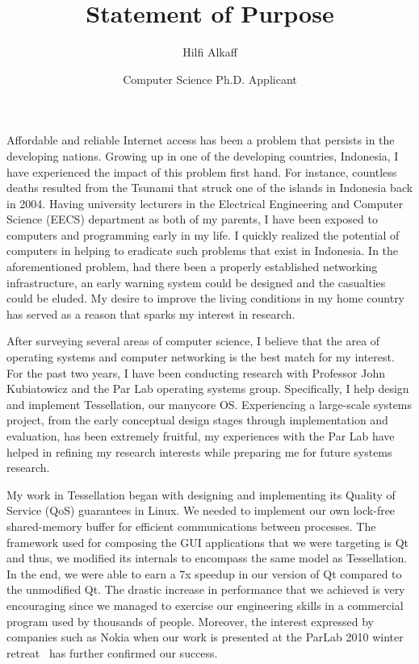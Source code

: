 \documentclass[11pt]{article}
\title{Statement of Purpose}
\author{Hilfi Alkaff}
\date{Computer Science Ph.D. Applicant}
\begin{document}
  \maketitle%

Affordable and reliable Internet access has been a problem that persists in the developing nations. Growing up in one of the developing countries, Indonesia, I have experienced the impact of this problem first hand. For instance, countless deaths resulted from the Tsunami that struck one of the islands in Indonesia back in 2004. Having university lecturers in the Electrical Engineering and Computer Science (EECS) department as both of my parents, I have been exposed to computers and programming early in my life. I quickly realized the potential of computers in helping to eradicate such problems that exist in Indonesia. In the aforementioned problem, had there been a properly established networking infrastructure, an early warning system could be designed and the casualties could be eluded. My desire to improve the living conditions in my home country has served as a reason that sparks my interest in research. \newline

After surveying several areas of computer science, I believe that the area of operating systems and computer networking is the best match for my interest. For the past two years, I have been conducting research with Professor John Kubiatowicz and the Par Lab operating systems group. Specifically, I help design and implement Tessellation, our manycore OS. Experiencing a large-scale systems project, from the early conceptual design stages through implementation and evaluation, has been extremely fruitful, my experiences with the Par Lab have helped in refining my research interests while preparing me for future systems research. \newline

My work in Tessellation began with designing and implementing its Quality of Service (QoS) guarantees in Linux. We needed to implement our own lock-free shared-memory buffer for efficient communications between processes. The framework used for composing the GUI applications that we were targeting is Qt and thus, we modified its internals to encompass the same model as Tessellation. In the end, we were able to earn a 7x speedup in our version of Qt compared to the unmodified Qt. The drastic increase in performance that we achieved is very encouraging since we managed to exercise our engineering skills in a commercial program used by thousands of people. Moreover, the interest expressed by companies such as Nokia when our work is presented at the ParLab 2010 winter retreat~\cite{tess_retreat2010} has further confirmed our success. \newline
\end{document}
